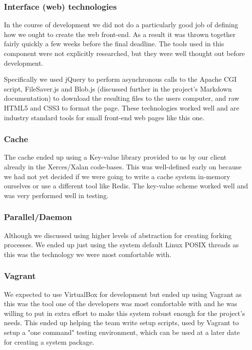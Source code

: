 \subsubsection{Interface (web) technologies}

In the course of development we did not do a particularly good job of defining how we ought to create the web front-end.
As a result it was thrown together fairly quickly a few weeks before the final deadline.
The tools used in this component were not explicitly researched, but they were well thought out before development.

Specifically we used jQuery to perform asynchronous calls to the Apache CGI script, FileSaver.js and Blob.js (discussed further in the project's Markdown documentation) to download the resulting files to the users computer, and raw HTML5 and CSS3 to format the page.
These technologies worked well and are industry standard tools for small front-end web pages like this one.

\subsubsection{Cache}

The cache ended up using a Key-value library provided to us by our client already in the Xerces/Xalan code-bases.
This was well-defined early on because we had not yet decided if we were going to write a cache system in-memory ourselves or use a different tool like Redis.
The key-value scheme worked well and was very performed well in testing.

\subsubsection{Parallel/Daemon}

Although we discussed using higher levels of abstraction for creating forking processes.
We ended up just using the system default Linux POSIX threads as this was the technology we were most comfortable with.

\subsubsection{Vagrant}

We expected to use VirtualBox for development but ended up using Vagrant as this was the tool one of the developers was most comfortable with and he was willing to put in extra effort to make this system robust enough for the project's needs.
This ended up helping the team write setup scripts, used by Vagrant to setup a "one command" testing environment, which can be used at a later date for creating a system package.

